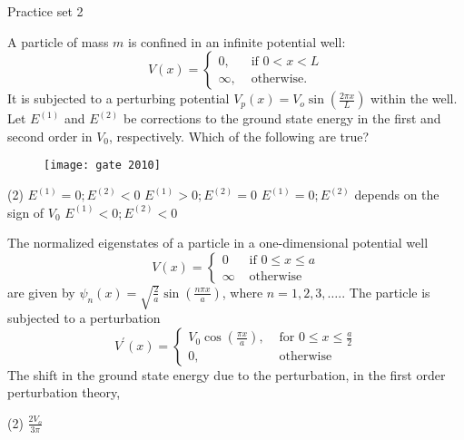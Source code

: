   \newpage
  \begin{abox}
  	Practice set 2
  	\end{abox}
  \begin{enumerate}
  	\begin{minipage}{\textwidth}
  	\item A particle of mass $m$ is confined in an infinite potential well:
  	$$
  	V(x)= \begin{cases}0, & \text { if } 0<x<L \\ \infty, & \text { otherwise. }\end{cases}
  	$$
  	It is subjected to a perturbing potential $V_{p}(x)=V_{o} \sin \left(\frac{2 \pi x}{L}\right)$ within the well. Let $E^{(1)}$ and $E^{(2)}$ be corrections to the ground state energy in the first and second order in $V_{0}$, respectively. Which of the following are true?
  	\begin{figure}[H]
  		\centering
  		\texttt{[image: gate 2010]}
  	\end{figure}
  \end{minipage}
  \begin{tasks}(2)
  	\task[\textbf{A.}]$E^{(1)}=0 ; E^{(2)}<0$
  	\task[\textbf{B.}]$E^{(1)}>0 ; E^{(2)}=0$
  	\task[\textbf{C.}]$E^{(1)}=0 ; E^{(2)}$ depends on the sign of $V_{0}$
  	\task[\textbf{D.}]$E^{(1)}<0 ; E^{(2)}<0$
  \end{tasks}
\begin{minipage}{\textwidth}
	\item The normalized eigenstates of a particle in a one-dimensional potential well
	$$
	V(x)= \begin{cases}0 & \text { if } 0 \leq x \leq a \\ \infty & \text { otherwise }\end{cases}
	$$
	are given by $\psi_{n}(x)=\sqrt{\frac{2}{a}} \sin \left(\frac{n \pi x}{a}\right)$, where $n=1,2,3, \ldots . .$
	The particle is subjected to a perturbation
	$$
	V^{\prime}(x)= \begin{cases}V_{0} \cos \left(\frac{\pi x}{a}\right), & \text { for } 0 \leq x \leq \frac{a}{2} \\ 0, & \text { otherwise }\end{cases}
	$$
	The shift in the ground state energy due to the perturbation, in the first order perturbation theory,
\end{minipage}
\begin{tasks}(2)
	\task[\textbf{A.}] $\frac{2 V_{o}}{3 \pi}$

\end{tasks}
\end{enumerate}
